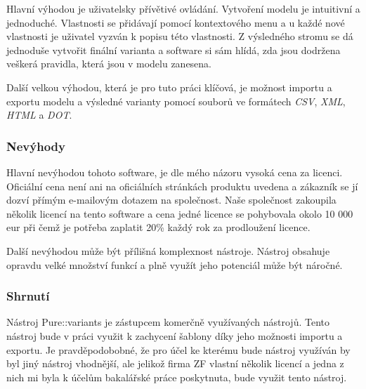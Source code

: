 Hlavní výhodou je uživatelsky přívětivé ovládání. Vytvoření modelu je intuitivní a jednoduché. Vlastnosti se přidávají pomocí kontextového menu a u každé nové vlastnosti je uživatel vyzván k popisu této vlastnosti. Z výsledného stromu se dá jednoduše vytvořit finální varianta a software si sám hlídá, zda jsou dodržena veškerá pravidla, která jsou v modelu zanesena.

Další velkou výhodou, která je pro tuto práci klíčová, je možnost importu a exportu modelu a výsledné varianty pomocí souborů ve formátech \textit{CSV}, \textit{XML}, \textit{HTML} a \textit{DOT}. 

\subsubsection{Nevýhody}

Hlavní nevýhodou tohoto software, je dle mého názoru vysoká cena za licenci. Oficiální cena není ani na oficiálních stránkách produktu uvedena a zákazník se jí dozví přímým e-mailovým dotazem na společnost. Naše společnost zakoupila několik licencí na tento software a cena jedné licence se pohybovala okolo 10 000 eur při čemž je potřeba zaplatit 20\% každý rok za prodloužení licence. 

Další nevýhodou může být přílišná komplexnost nástroje. Nástroj obsahuje opravdu velké množství funkcí a plně využít jeho potenciál může být náročné. 

\subsubsection{Shrnutí}
Nástroj Pure::variants je zástupcem komerčně využívaných nástrojů. Tento nástroj bude v práci využit k zachycení šablony díky jeho možnosti importu a exportu. Je pravděpodobobné, že pro účel ke kterému bude nástroj využíván by byl jiný nástroj vhodnější, ale jelikož firma ZF vlastní několik licencí a jedna z nich mi byla k účelům bakalářské práce poskytnuta, bude využit tento nástroj.

